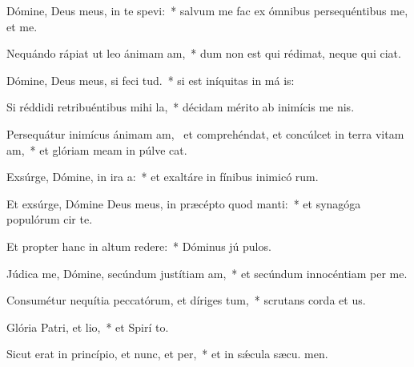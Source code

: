 \item Dómine, Deus meus, in te spevi:~* salvum me fac ex ómnibus persequéntibus me, et  me.
\item Nequándo rápiat ut leo ánimam am,~* dum non est qui rédimat, neque qui  ciat.
\item Dómine, Deus meus, si feci tud.~* si est iníquitas in má is:
\item Si réddidi retribuéntibus mihi la,~* décidam mérito ab inimícis me nis.
\item Persequátur inimícus ánimam am,~\pscross{} et comprehéndat, et concúlcet in terra vitam am,~* et glóriam meam in púlve cat.
\item Exsúrge, Dómine, in ira a:~* et exaltáre in fínibus inimicó rum.
\item Et exsúrge, Dómine Deus meus, in præcépto quod manti:~* et synagóga populórum cir te.
\item Et propter hanc in altum redere:~* Dóminus jú pulos.
\item Júdica me, Dómine, secúndum justítiam am,~* et secúndum innocéntiam  per me.
\item Consumétur nequítia peccatórum, et díriges tum,~* scrutans corda et  us.
\item Glória Patri, et lio,~* et Spirí to.
\item Sicut erat in princípio, et nunc, et per,~* et in sǽcula sæcu. men.
